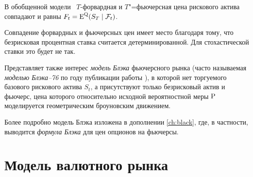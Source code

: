 \begin{corollary}
В обобщенной модели \bs\ $T$-форвардная и $T$"=фьючерсная цена рискового актива совпадают и равны $F_t=\E^\Q(S_T\mid \F_t)$.
\end{corollary}

\begin{remark}
Совпадение форвардных и фьючерсных цен имеет место благодаря тому, что безрисковая процентная ставка считается детерминированной.
Для стохастической ставки это будет не так.
\end{remark}

\begin{remark}
\label{bs2:r:black}
Представляет также интерес \emph{модель Блэка} фьючерсного рынка (часто называемая \emph{моделью Блэка--76} по году публикации работы \cite{Black76}), в которой нет торгуемого базового рискового актива $S_t$, а присутствуют только безрисковый актив и фьючерс, цена которого относительно исходной вероятностной меры $\P$ моделируется геометрическим броуновским движением.

Более подробно модель Блэка изложена в дополнении \ref{ch:black}, где, в частности, выводится \emph{формула Блэка} для цен опционов на фьючерсы.




\end{remark}


\section{Модель валютного рынка}

